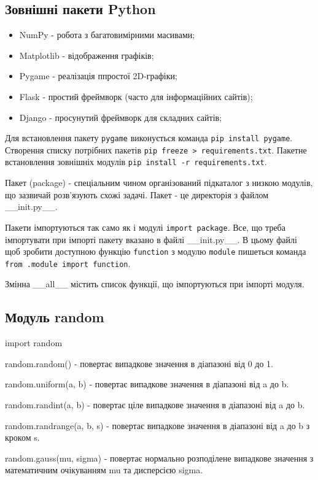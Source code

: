\subsection{Зовнішні пакети Python} 
\begin{frame}
\begin{itemize}
  \item NumPy - робота з багатовимірними масивами;
  \item Matplotlib - відображення графіків;
  \item Pygame - реалізація ппростої 2D-графіки;
  \item Flask - простий фреймворк (часто для інформаційних сайтів);
  \item Django - просунутий фреймворк для складних сайтів;
\end{itemize}

Для встановлення пакету \texttt{pygame} виконується команда \texttt{pip install pygame}. Створення списку потрібних пакетів \texttt{pip freeze > requirements.txt}. Пакетне встановлення зовнішніх модулів \texttt{pip install -r requirements.txt}. 
\end{frame}

\begin{frame}
Пакет (package) - спеціальним чином організований підкаталог з низкою модулів, що зазвичай розв'язують схожі задачі. Пакет - це директорія з файлом \_\_init.py\_\_.

Пакети імпортуються так само як і модулі \texttt{import package}. Все, що треба імпортувати при імпорті пакету вказано в файлі \_\_init.py\_\_. В цьому файлі щоб зробити доступною функцію \texttt{function} з модулю \texttt{module}  пишеться команда \texttt{from .module import function}.

Змінна \_\_all\_\_ містить список функції, що імпортуються при імпорті модуля.
\end{frame}

\subsection{Модуль random} 
\begin{frame}
import random

random.random() - повертає випадкове значення в діапазоні від 0 до 1.

random.uniform(a, b) - повертає випадкове значення в діапазоні від a до b.

random.randint(a, b) - повертає ціле випадкове значення в діапазоні від a до b.

random.randrange(a, b, s) - повертає випадкове значення в діапазоні від a до b з кроком s.

random.gauss(mu, sigma) - повертає нормально розподілене випадкове значення з математичним очікуванням mu та дисперсією sigma.

\end{frame}

